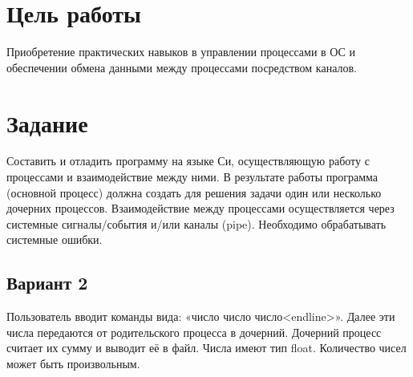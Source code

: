 \section*{Цель работы}
Приобретение практических навыков в управлении процессами в ОС и обеспечении обмена данными между процессами посредством каналов.

\section*{Задание}
Составить и отладить программу на языке Си, осуществляющую работу с процессами и взаимодействие между ними. В результате работы программа (основной процесс) должна создать для решения задачи один или несколько дочерних процессов. Взаимодействие между процессами осуществляется через системные сигналы/события и/или каналы (pipe). Необходимо обрабатывать системные ошибки.

\subsection*{Вариант 2}
Пользователь вводит команды вида: «число число число<endline>». Далее эти числа передаются от родительского процесса в дочерний. Дочерний процесс считает их сумму и выводит её в файл. Числа имеют тип float. Количество чисел может быть произвольным.